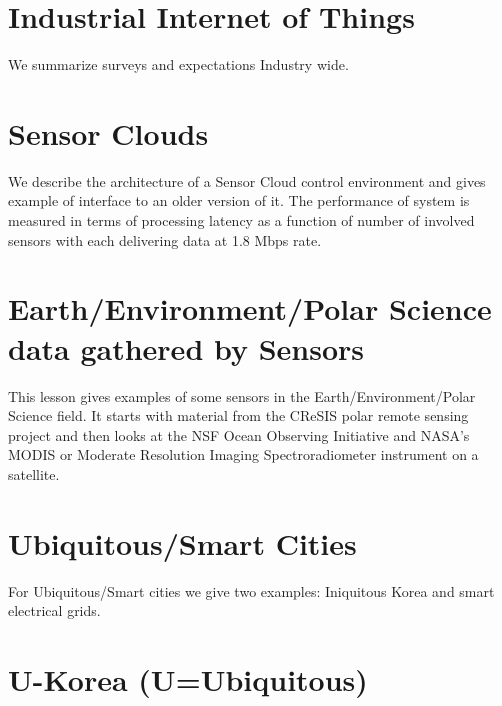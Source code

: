 \section{Industrial Internet of Things}\label{industrial-internet-of-things}

We summarize surveys and expectations Industry wide.



\section{Sensor Clouds}\label{sensor-clouds}

We describe the architecture of a Sensor Cloud control environment and
gives example of interface to an older version of it. The performance of
system is measured in terms of processing latency as a function of
number of involved sensors with each delivering data at 1.8 Mbps rate.



\section{Earth/Environment/Polar Science data gathered by
Sensors}\label{earthenvironmentpolar-science-data-gathered-by-sensors}

This lesson gives examples of some sensors in the
Earth/Environment/Polar Science field. It starts with material from the
CReSIS polar remote sensing project and then looks at the NSF Ocean
Observing Initiative and NASA's MODIS or Moderate Resolution Imaging
Spectroradiometer instrument on a satellite.



\section{Ubiquitous/Smart Cities}\label{ubiquitoussmart-cities}

For Ubiquitous/Smart cities we give two examples: Iniquitous Korea and
smart electrical grids.



\section{U-Korea (U=Ubiquitous)}\label{u-korea-uubiquitous}

